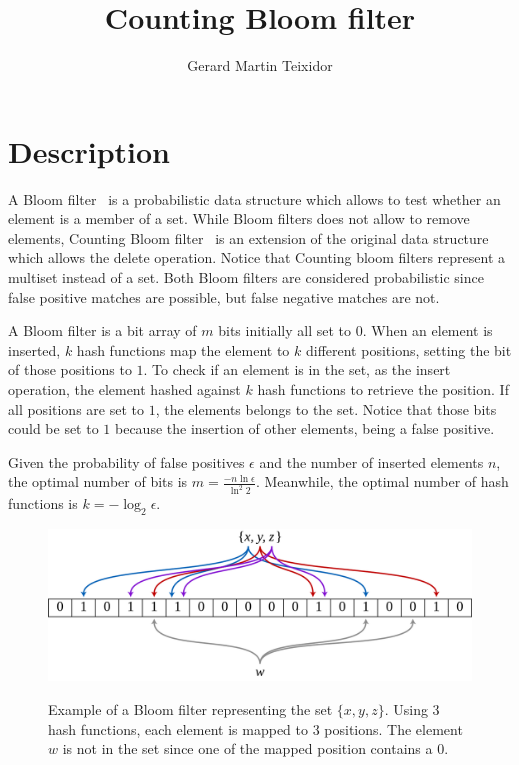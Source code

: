 \documentclass{article}
\title{Counting Bloom filter}
\author{Gerard Martin Teixidor}
\begin{document}
\maketitle

\section*{Description}
A Bloom filter~\cite{bloom} is a probabilistic data structure which allows to test whether an element is a member of a set. While Bloom filters does not allow to remove elements, Counting Bloom filter~\cite{counting} is an extension of the original data structure which allows the delete operation. Notice that Counting bloom filters represent a multiset instead of a set. Both Bloom filters are considered probabilistic since false positive matches are possible, but false negative matches are not.

A Bloom filter is a bit array of $m$ bits initially all set to $0$. When an element is inserted, $k$ hash functions map the element to $k$ different positions, setting the bit of those positions to $1$. To check if an element is in the set, as the insert operation, the element hashed against $k$ hash functions to retrieve the position. If all positions are set to $1$, the elements belongs to the set. Notice that those bits could be set to $1$ because the insertion of other elements, being a false positive.

Given the probability of false positives $\epsilon$ and the number of inserted elements $n$, the optimal number of bits is $m = \frac{-n\ln\epsilon}{\ln^2 2}$. Meanwhile, the optimal number of hash functions is $k=-\log_2\epsilon$.

\begin{figure}[h]
\centering
\includegraphics[width=0.8\linewidth]{bloom_filter.png}
\label{fig:bloom_filter}
\caption{Example of a Bloom filter representing the set $\{x, y ,z\}$. Using $3$ hash functions, each element is mapped to $3$ positions. The element $w$ is not in the set since one of the mapped position contains a $0$.}
\end{figure}
\end{document}
